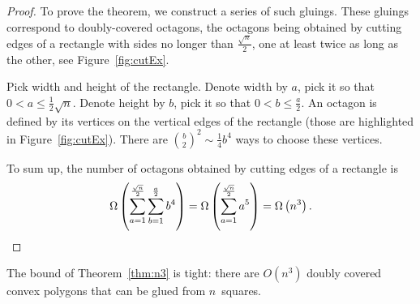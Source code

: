 \documentclass[a4paper,11pt]{article}
\begin{document}
\begin{proof}
To prove the theorem, we construct a series of such gluings. These gluings correspond to doubly-covered octagons, the octagons being obtained by cutting edges of a rectangle with sides no longer than $\frac{\sqrt{n}}{2}$, one at least twice as long as the other, see Figure~\ref{fig:cutEx}.



Pick width and height of the rectangle. Denote width by $a$, pick it so that $0 < a \le \frac12 \sqrt{n}$. Denote height by $b$, pick it so that $0 < b \le \frac{a}2$. An octagon is defined by its vertices on the vertical edges of the rectangle (those are highlighted in Figure~\ref{fig:cutEx}). There are $\binom{b}{2}^2 \sim \frac14 b^4$ ways to choose these vertices.

To sum up, the number of octagons obtained by cutting edges of a rectangle is
\[ \Omega\left( \sum\limits_{a=1}^{\frac{\sqrt{n}}{2}} \sum\limits_{b=1}^{\frac{a}{2}} b^4 \right) =
	\Omega\left( \sum\limits_{a=1}^{\frac{\sqrt{n}}{2}} a^5 \right) = \Omega \left( n^3 \right). \]

\end{proof}

\begin{theorem}
	The bound of Theorem~\ref{thm:n3} is tight: there are $O(n^3)$ doubly covered convex polygons that can be glued from $n$~squares.
\end{theorem}
\end{document}
